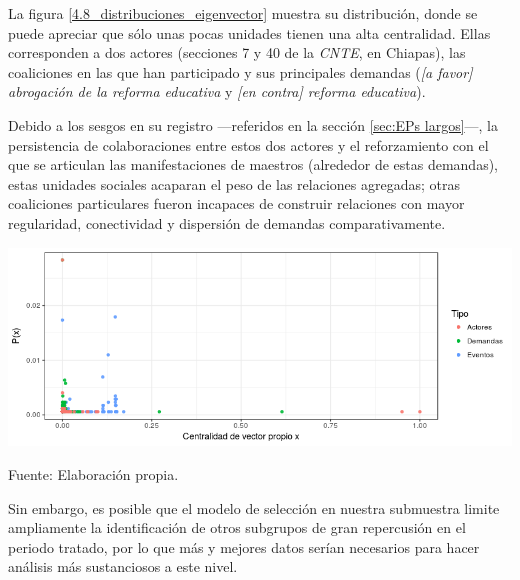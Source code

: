 \documentclass[letterpaper, 11pt]{book}
\theoremstyle{definition}
\theoremstyle{remark}
\begin{document}
La figura \ref{4.8_distribuciones_eigenvector} muestra su distribución, donde se puede apreciar que sólo unas pocas unidades tienen una alta centralidad. 
Ellas corresponden a dos actores (secciones 7 y 40 de la \emph{CNTE}, en Chiapas), las coaliciones en las que han participado y sus principales demandas (\emph{[a favor] abrogación de la reforma educativa} y \emph{[en contra] reforma educativa}). 


Debido a los sesgos en su registro ---referidos en la sección \ref{sec:EPs largos}---, la persistencia de colaboraciones entre estos dos actores y el reforzamiento con el que se articulan las manifestaciones de maestros (alrededor de estas demandas), estas unidades sociales acaparan el peso de las relaciones agregadas; otras coaliciones particulares fueron incapaces de construir relaciones con mayor regularidad, conectividad y dispersión de demandas comparativamente. 

\begin{minipage}{\linewidth}
\centering
{} \label{4.8_distribuciones_eigenvector}
\includegraphics[scale=0.7]{img/4.8_distribuciones_eigenvector.png}
\par
\small Fuente: Elaboración propia.
\end{minipage}\bigskip

Sin embargo, es posible que el modelo de selección en nuestra submuestra limite ampliamente la identificación de otros subgrupos de gran repercusión en el periodo tratado, por lo que más y mejores datos serían necesarios para hacer análisis más sustanciosos a este nivel.





\end{document}
